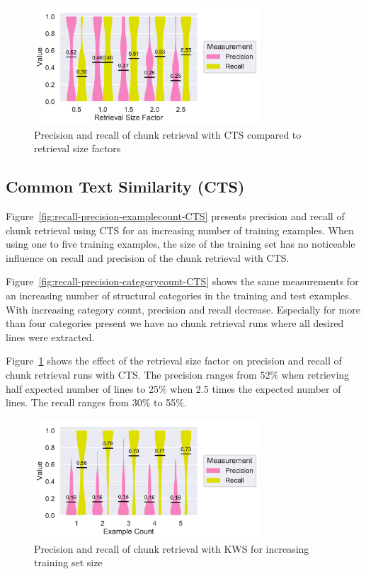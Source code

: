 \documentclass[\myrootdir/main.tex]{subfiles}
\begin{document}
\begin{figure}[htbp]
		\centering
		\includegraphics[width=0.75\textwidth, clip]{img/big-study/contextsizefactor-precision-recall-CTS.pdf}
		\caption{Precision and recall of chunk retrieval with CTS compared to retrieval size factors}
		\label{fig:contextsizefactor-precision-recall-CTS}
\end{figure}

\subsection{Common Text Similarity (CTS)}
Figure~\ref{fig:recall-precision-examplecount-CTS} presents precision and recall of chunk retrieval using CTS for an increasing number of training examples.
When using one to five training examples, the size of the training set has no noticeable influence on recall and precision of the chunk retrieval with CTS.

Figure~\ref{fig:recall-precision-categorycount-CTS} shows the same measurements for an increasing number of structural categories in the training and test examples.
With increasing category count, precision and recall decrease.
Especially for more than four categories present we have no chunk retrieval runs where all desired lines were extracted.

Figure~\ref{fig:contextsizefactor-precision-recall-CTS} shows the effect of the retrieval size factor on precision and recall of chunk retrieval runs with CTS\@.
The precision ranges from 52\% when retrieving half expected number of lines to 25\% when 2.5 times the expected number of lines.
The recall ranges from 30\% to 55\%.

\begin{figure}[htbp]
		\centering
		\includegraphics[width=0.75\textwidth, clip]{img/big-study/recall-precision-examplecount-KWS.pdf}
		\caption{Precision and recall of chunk retrieval with KWS for increasing training set size}
		\label{fig:recall-precision-examplecount-KWS}
\end{figure}
\end{document}
